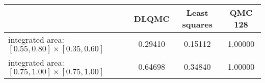 \begin{tabular}{|l|c|c|c|}
\hline
 &DLQMC&Least squares&QMC 128\\ 
\hline

integrated area: $[0.55,0.80]\times [0.35,0.60]$ & 0.29410 & 0.15112 & 1.00000\\ 
\hline
integrated area: $[0.75,1.00]\times [0.75,1.00]$ & 0.64698 & 0.34840 & 1.00000\\ 
\hline
\end{tabular}

